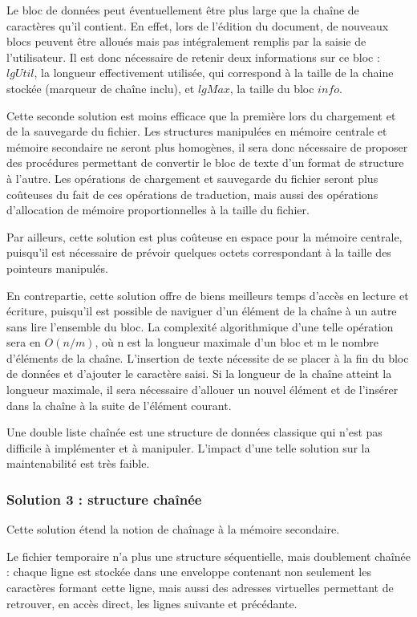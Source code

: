 Le bloc de données peut éventuellement être plus large que la chaîne de
caractères qu'il contient. En effet, lors de l'édition du document, de nouveaux
blocs peuvent être alloués mais pas intégralement remplis par la saisie de
l'utilisateur. Il est donc nécessaire de retenir deux informations sur ce bloc
: $lgUtil$, la longueur effectivement utilisée, qui correspond à la taille de
la chaine stockée (marqueur de chaîne inclu),  et $lgMax$, la taille du bloc
$info$.

Cette seconde solution est moins efficace que la première lors du chargement et
de la sauvegarde du fichier. Les structures manipulées en mémoire centrale et
mémoire secondaire ne seront plus homogènes, il sera donc nécessaire de
proposer des procédures permettant de convertir le bloc de texte d'un format de
structure à l'autre. Les opérations de chargement et sauvegarde du fichier
seront plus coûteuses du fait de ces opérations de traduction, mais aussi des
opérations d'allocation de mémoire proportionnelles à la taille du fichier.

Par ailleurs, cette solution est plus coûteuse en espace pour la mémoire
centrale, puisqu'il est nécessaire de prévoir quelques octets correspondant à
la taille des pointeurs manipulés.

En contrepartie, cette solution offre de biens meilleurs temps d'accès en
lecture et écriture, puisqu'il est possible de naviguer d'un élément de la
chaîne à un autre sans lire l'ensemble du bloc. La complexité algorithmique
d'une telle opération sera en $O(n/m)$, où n est la longueur maximale d'un bloc
et m le nombre d'éléments de la chaîne. L'insertion de texte nécessite de se
placer à la fin du bloc de données et d'ajouter le caractère saisi. Si la
longueur de la chaîne atteint la longueur maximale, il sera nécessaire
d'allouer un nouvel élément et de l'insérer dans la chaîne à la suite de
l'élément courant.

Une double liste chaînée est une structure de données classique qui n'est pas
difficile à implémenter et à manipuler. L'impact d'une telle solution sur la
maintenabilité est très faible.

\subsubsection{Solution 3 : structure chaînée}
Cette solution étend la notion de chaînage à la mémoire secondaire.

Le fichier temporaire n'a plus une structure séquentielle, mais doublement chaînée : chaque ligne est stockée dans une \og enveloppe \fg contenant non seulement les caractères formant cette ligne, mais aussi des adresses virtuelles permettant de retrouver, en accès direct, les lignes suivante et précédante.

